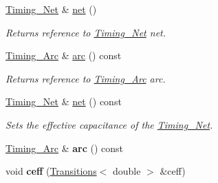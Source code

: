 \begin{DoxyCompactItemize}
\hyperlink{classTiming__Analysis_1_1Timing__Net}{Timing\-\_\-\-Net} \& \hyperlink{classTiming__Analysis_1_1Timing__Point_ae5be69561ff151feb055e8081911d4c1}{net} ()
\begin{DoxyCompactList}\small\item\em Returns reference to \hyperlink{classTiming__Analysis_1_1Timing__Net}{Timing\-\_\-\-Net} net. \end{DoxyCompactList}\item 
\hyperlink{classTiming__Analysis_1_1Timing__Arc}{Timing\-\_\-\-Arc} \& \hyperlink{classTiming__Analysis_1_1Timing__Point_adfac3529231393d429f746d9e1f1bfb6}{arc} () const 
\begin{DoxyCompactList}\small\item\em Returns reference to \hyperlink{classTiming__Analysis_1_1Timing__Arc}{Timing\-\_\-\-Arc} arc. \end{DoxyCompactList}\item 
\hyperlink{classTiming__Analysis_1_1Timing__Net}{Timing\-\_\-\-Net} \& \hyperlink{classTiming__Analysis_1_1Timing__Point_aa63fa25bd56985d8deca58355c48867b}{net} () const 
\begin{DoxyCompactList}\small\item\em Sets the effective capacitance of the \hyperlink{classTiming__Analysis_1_1Timing__Net}{Timing\-\_\-\-Net}. \end{DoxyCompactList}\item 
\hypertarget{classTiming__Analysis_1_1Timing__Point_adfac3529231393d429f746d9e1f1bfb6}{\hyperlink{classTiming__Analysis_1_1Timing__Arc}{Timing\-\_\-\-Arc} \& {\bfseries arc} () const }\label{classTiming__Analysis_1_1Timing__Point_adfac3529231393d429f746d9e1f1bfb6}

\item 
\hypertarget{classTiming__Analysis_1_1Timing__Point_ab4f9a99d6dad95ec709f165f57478e66}{void {\bfseries ceff} (\hyperlink{classTransitions}{Transitions}$<$ double $>$ \&ceff)}\label{classTiming__Analysis_1_1Timing__Point_ab4f9a99d6dad95ec709f165f57478e66}


\end{DoxyCompactItemize}
